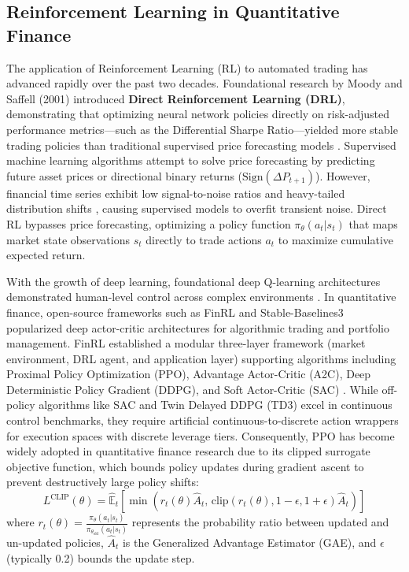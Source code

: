 \documentclass[11pt,a4paper]{article}
\begin{document}
\subsection{Reinforcement Learning in Quantitative Finance}
The application of Reinforcement Learning (RL) to automated trading has advanced rapidly over the past two decades. Foundational research by Moody and Saffell (2001) introduced \textbf{Direct Reinforcement Learning (DRL)}, demonstrating that optimizing neural network policies directly on risk-adjusted performance metrics---such as the Differential Sharpe Ratio---yielded more stable trading policies than traditional supervised price forecasting models \cite{moody2001}. Supervised machine learning algorithms attempt to solve price forecasting by predicting future asset prices or directional binary returns ($\text{Sign}(\Delta P_{t+1})$). However, financial time series exhibit low signal-to-noise ratios and heavy-tailed distribution shifts \cite{dixon2020}, causing supervised models to overfit transient noise. Direct RL bypasses price forecasting, optimizing a policy function $\pi_\theta(a_t | s_t)$ that maps market state observations $s_t$ directly to trade actions $a_t$ to maximize cumulative expected return.

With the growth of deep learning, foundational deep Q-learning architectures demonstrated human-level control across complex environments \cite{mnih2015}. In quantitative finance, open-source frameworks such as FinRL \cite{liu2021} and Stable-Baselines3 \cite{raffin2021} popularized deep actor-critic architectures for algorithmic trading and portfolio management. FinRL established a modular three-layer framework (market environment, DRL agent, and application layer) supporting algorithms including Proximal Policy Optimization (PPO), Advantage Actor-Critic (A2C), Deep Deterministic Policy Gradient (DDPG), and Soft Actor-Critic (SAC) \cite{haarnoja2018}. While off-policy algorithms like SAC and Twin Delayed DDPG (TD3) \cite{fujimoto2018} excel in continuous control benchmarks, they require artificial continuous-to-discrete action wrappers for execution spaces with discrete leverage tiers. Consequently, PPO \cite{schulman2017} has become widely adopted in quantitative finance research due to its clipped surrogate objective function, which bounds policy updates during gradient ascent to prevent destructively large policy shifts:
\begin{equation}
L^{\text{CLIP}}(\theta) = \hat{\mathbb{E}}_t \left[ \min\left(r_t(\theta)\hat{A}_t, \, \text{clip}(r_t(\theta), 1-\epsilon, 1+\epsilon)\hat{A}_t\right) \right]
\end{equation}
where $r_t(\theta) = \frac{\pi_\theta(a_t | s_t)}{\pi_{\theta_{\text{old}}}(a_t | s_t)}$ represents the probability ratio between updated and un-updated policies, $\hat{A}_t$ is the Generalized Advantage Estimator (GAE), and $\epsilon$ (typically 0.2) bounds the update step.
\end{document}
